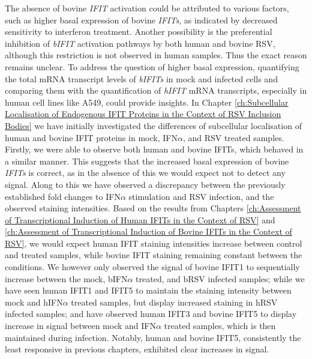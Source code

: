 The absence of bovine \textit{IFIT} activation could be attributed to various factors, such as higher basal expression of bovine \textit{IFITs}, as indicated by decreased sensitivity to interferon treatment. Another possibility is the preferential inhibition of \textit{bIFIT} activation pathways by both human and bovine RSV, although this restriction is not observed in human samples. Thus the exact reason remains unclear. To address the question of higher basal expression, quantifying the total mRNA transcript levels of \textit{bIFITs} in mock and infected cells and comparing them with the quantification of \textit{hIFIT} mRNA transcripts, especially in human cell lines like A549, could provide insights. In Chapter \ref{ch:Subcellular Localisation of Endogenous IFIT Proteins in the Context of RSV Inclusion Bodies} we have initially investigated the differences of subcellular localisation of human and bovine IFIT proteins in mock, IFN$\alpha$, and RSV treated samples. Firstly, we were able to observe both human and bovine IFITs, which behaved in a similar manner. This suggests that the increased basal expression of bovine \textit{IFITs} is correct, as in the absence of this we would expect not to detect any signal. Along to this we have observed a discrepancy between the previously established fold changes to IFN$\alpha$ stimulation and RSV infection, and the observed staining intensities. Based on the results from Chapters \ref{ch:Assessment of Transcriptional Induction of Human IFITs in the Context of RSV} and \ref{ch:Assessment of Transcriptional Induction of Bovine IFITs in the Context of RSV}, we would expect human IFIT staining intensities increase between control and treated samples, while bovine IFIT staining remaining constant between the conditions. We however only observed the signal of bovine IFIT1 to sequentially increase between the mock, bIFN$\alpha$ treated, and bRSV infected samples; while we have seen human IFIT1 and IFIT5 to maintain the staining intensity between mock and hIFN$\alpha$ treated samples, but display increased staining in hRSV infected samples; and have observed human IFIT3 and bovine IFIT5 to display increase in signal between mock and IFN$\alpha$ treated samples, which is then maintained during infection. Notably, human and bovine IFIT5, consistently the least responsive in previous chapters, exhibited clear increases in signal. 

